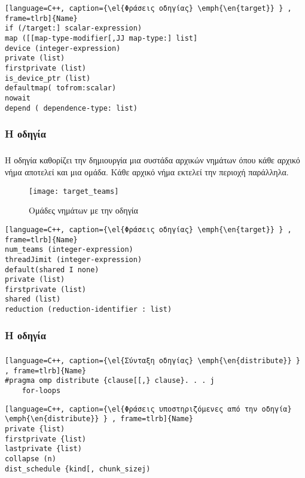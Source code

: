 \clearpage

\begin{lstlisting}[language=C++, caption={\el{Φράσεις οδηγίας} \emph{\en{target}} } , frame=tlrb]{Name}
if (/target:] scalar-expression)
map ([[map-type-modifier[,JJ map-type:] list]
device (integer-expression)
private (list)
firstprivate (list)
is_device_ptr (list)
defaultmap( tofrom:scalar)
nowait
depend ( dependence-type: list)
\end{lstlisting}

\subsubsection{Η οδηγία }
\subparagraph{}
Η οδηγία \emph{} καθορίζει την δημιουργία μια συστάδα αρχικών νημάτων όπου κάθε αρχικό νήμα αποτελεί και μια ομάδα. Κάθε αρχικό νήμα εκτελεί την περιοχή παράλληλα.

\begin{figure}[h]
\texttt{[image: target\_teams]}
\centering
\captionsetup{justification=centering, singlelinecheck=false}
	\caption{Ομάδες νημάτων με την οδηγία \emph{}}
\label{fig:target_teams}
\end{figure}


\begin{lstlisting}[language=C++, caption={\el{Φράσεις οδηγίας} \emph{\en{target}} } , frame=tlrb]{Name}
num_teams (integer-expression)
threadJimit (integer-expression)
default(shared I none)
private (list)
firstprivate (list)
shared (list)
reduction (reduction-identifier : list)
\end{lstlisting}

\subsubsection{Η οδηγία }
\subparagraph{}


\begin{lstlisting}[language=C++, caption={\el{Σύνταξη οδηγίας} \emph{\en{distribute}} } , frame=tlrb]{Name}
#pragma omp distribute {clause[[,} clause}. . . j
	for-loops
\end{lstlisting}


\begin{lstlisting}[language=C++, caption={\el{Φράσεις υποστηριζόμενες από την οδηγία} \emph{\en{distribute}} } , frame=tlrb]{Name}
private {list)
firstprivate {list)
lastprivate {list)
collapse (n)
dist_schedule {kind[, chunk_sizej)
\end{lstlisting}

